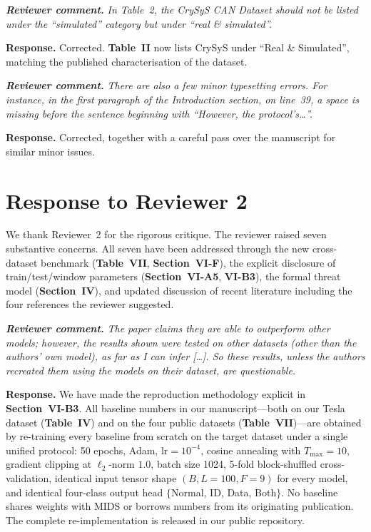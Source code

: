 \documentclass[11pt,a4paper]{article}
\newcommand{\rcomment}[1]{%
  \par\medskip
  \begingroup
  \itshape
  \textbf{Reviewer comment.}\,\,#1
  \endgroup
  \par
}
\newcommand{\rresponse}[1]{%
  \par
  \begingroup
  \color{NavyBlue}
  \textbf{Response.}\,\,#1
  \endgroup
  \par\medskip
}
\newcommand{\xref}[1]{\textbf{#1}}
\begin{document}
\rcomment{In Table~2, the CrySyS CAN Dataset should not be listed
under the ``simulated'' category but under ``real \& simulated''.}
\rresponse{Corrected. \xref{Table~II} now lists CrySyS under
``Real \& Simulated'', matching the published characterisation
of the dataset.}

\rcomment{There are also a few minor typesetting errors. For
instance, in the first paragraph of the Introduction section, on
line~39, a space is missing before the sentence beginning with
``However, the protocol's\dots''.}
\rresponse{Corrected, together with a careful pass over the
manuscript for similar minor issues.}

\section*{Response to Reviewer 2}

We thank Reviewer~2 for the rigorous critique. The reviewer raised
seven substantive concerns. All seven have been addressed through
the new cross-dataset benchmark (\xref{Table~VII},
\xref{Section~VI-F}), the explicit disclosure of train/test/window
parameters (\xref{Section~VI-A5}, \xref{VI-B3}), the formal threat
model (\xref{Section~IV}), and updated discussion of recent
literature including the four references the reviewer suggested.

\rcomment{The paper claims they are able to outperform other
models; however, the results shown were tested on other datasets
(other than the authors' own model), as far as I can infer
[\dots]. So these results, unless the authors recreated them using
the models on their dataset, are questionable.}
\rresponse{We have made the reproduction methodology explicit in
\xref{Section~VI-B3}. All baseline numbers in our manuscript---both
on our Tesla dataset (\xref{Table~IV}) and on the four public
datasets (\xref{Table~VII})---are obtained by re-training every
baseline from scratch on the target dataset under a single
unified protocol: 50 epochs, Adam, $\mathrm{lr}=10^{-4}$, cosine
annealing with $T_{\max}=10$, gradient clipping at $\ell_2$-norm
$1.0$, batch size 1024, 5-fold block-shuffled cross-validation,
identical input tensor shape $(B,L{=}100,F{=}9)$ for every model,
and identical four-class output head $\{$Normal, ID, Data,
Both$\}$. No baseline shares weights with MIDS or borrows numbers
from its originating publication. The complete re-implementation
is released in our public repository.}
\end{document}
